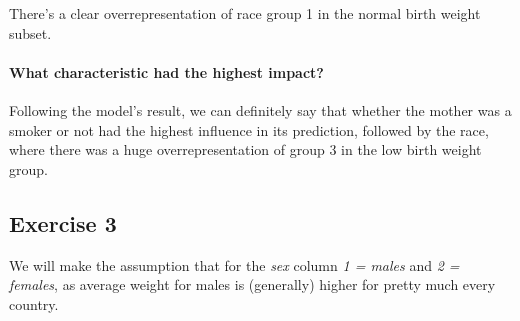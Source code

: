 \documentclass[]{article}
\newenvironment{Shaded}{\begin{snugshade}}{\end{snugshade}}
\newcommand{\CommentTok}[1]{\textcolor[rgb]{0.56,0.35,0.01}{\textit{#1}}}
\newcommand{\DataTypeTok}[1]{\textcolor[rgb]{0.13,0.29,0.53}{#1}}
\newcommand{\DecValTok}[1]{\textcolor[rgb]{0.00,0.00,0.81}{#1}}
\newcommand{\KeywordTok}[1]{\textcolor[rgb]{0.13,0.29,0.53}{\textbf{#1}}}
\newcommand{\NormalTok}[1]{#1}
\newcommand{\OperatorTok}[1]{\textcolor[rgb]{0.81,0.36,0.00}{\textbf{#1}}}
\newcommand{\OtherTok}[1]{\textcolor[rgb]{0.56,0.35,0.01}{#1}}
\newcommand{\StringTok}[1]{\textcolor[rgb]{0.31,0.60,0.02}{#1}}
\let\oldparagraph\paragraph
\renewcommand{\paragraph}[1]{\oldparagraph{#1}\mbox{}}
\begin{document}
There's a clear overrepresentation of race group 1 in the normal birth
weight subset.

\hypertarget{what-characteristic-had-the-highest-impact}{%
\paragraph{What characteristic had the highest
impact?}\label{what-characteristic-had-the-highest-impact}}

Following the model's result, we can definitely say that whether the
mother was a smoker or not had the highest influence in its prediction,
followed by the race, where there was a huge overrepresentation of group
3 in the low birth weight group.

\hypertarget{exercise-3}{%
\subsection{Exercise 3}\label{exercise-3}}

\begin{Shaded}
\end{Shaded}

\begin{Shaded}
\end{Shaded}

We will make the assumption that for the \emph{sex} column \emph{1 =
males} and \emph{2 = females}, as average weight for males is
(generally) higher for pretty much every country.
\end{document}
